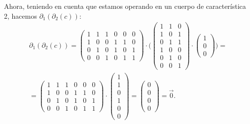 \documentclass[12pt, a4paper, twoside]{book}
\numberwithin{equation}{section}
\theoremstyle{definition}
\newenvironment{ejem}
  {\pushQED{\qed}\renewcommand{\qedsymbol}{$\blacktriangleleft$}\ejemplo}
  {\popQED\endejemplo}
\theoremstyle{remark}
\theoremstyle{plain}
\begin{document}
\begin{ejem}
		Ahora, teniendo en cuenta que estamos operando en un cuerpo de 
		característica 2, hacemos $\partial_{1}(\partial_{2}(c))$:
		\begin{equation*}
			\begin{split}
				\partial_{1}(\partial_{2}(c))=\begin{pmatrix}
				1 & 1 & 1 & 0 & 0 &0 \\
				1 & 0 & 0 & 1 & 1 &0 \\
				0 & 1 & 0 & 1 & 0 &1 \\
				0 & 0 & 1 & 0 & 1 &1
			\end{pmatrix}\cdot \Bigg( 
				\begin{pmatrix}
				1 & 1 & 0 \\
				1 & 0 & 1 \\
				0 & 1 & 1 \\
				1 & 0 & 0 \\
				0 & 1 & 0 \\
				0 & 0 & 1
				\end{pmatrix}
				\cdot
				\begin{pmatrix}
				1 \\
				0 \\
				0 
				\end{pmatrix} \Bigg ) = \\
				=\begin{pmatrix}
				1 & 1 & 1 & 0 & 0 &0 \\
				1 & 0 & 0 & 1 & 1 &0 \\
				0 & 1 & 0 & 1 & 0 &1 \\
				0 & 0 & 1 & 0 & 1 &1
				\end{pmatrix}
				\cdot
				\begin{pmatrix}
				1 \\
				1 \\
				0 \\
				1 \\
				0 \\
				0
				\end{pmatrix} =
				\begin{pmatrix}
                                0 \\
				0 \\
				0 \\
				0
				\end{pmatrix}=
				\vec{0}.
			\end{split}
		\end{equation*}


\end{ejem}
\end{document}
